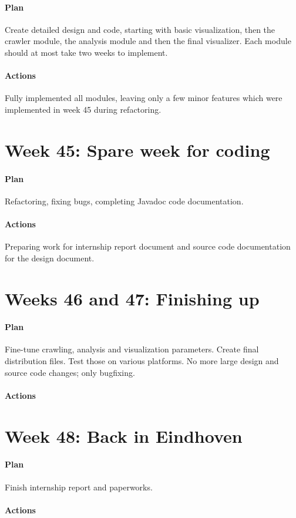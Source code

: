 \paragraph{Plan} Create detailed design and code, starting with basic
visualization, then the crawler module, the analysis module and then the final
visualizer. Each module should at most take two weeks to implement.

\paragraph{Actions} Fully implemented all modules, leaving only a few minor
features which were implemented in week 45 during refactoring.

\section{Week 45: Spare week for coding}

\paragraph{Plan} Refactoring, fixing bugs, completing Javadoc code
documentation.

\paragraph{Actions} Preparing work for internship report document and source
code documentation for the design document.

\section{Weeks 46 and 47: Finishing up}

\paragraph{Plan} Fine-tune crawling, analysis and visualization parameters.
Create final distribution files. Test those on various platforms. No more large
design and source code changes; only bugfixing.

\paragraph{Actions} 

\section{Week 48: Back in Eindhoven}

\paragraph{Plan} Finish internship report and paperworks.

\paragraph{Actions} 

